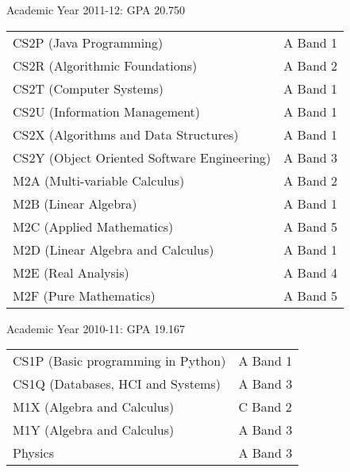 \documentclass[10pt,a4paper]{article}
\begin{document}
Academic Year 2011-12: GPA 20.750

\begin{tabular}{p{10cm}l}
    CS2P (Java Programming) & A Band 1\\
    CS2R (Algorithmic Foundations) & A Band 2\\
    CS2T (Computer Systems) & A Band 1\\
    CS2U (Information Management) & A Band 1\\
    CS2X (Algorithms and Data Structures) & A Band 1\\
    CS2Y (Object Oriented Software Engineering) & A Band 3\\
    M2A (Multi-variable Calculus) & A Band 2\\
    M2B (Linear Algebra) & A Band 1\\
    M2C (Applied Mathematics) & A Band 5\\
    M2D (Linear Algebra and Calculus) & A Band 1\\
    M2E (Real Analysis) & A Band 4\\
    M2F (Pure Mathematics) & A Band 5\\
\end{tabular}

Academic Year 2010-11: GPA 19.167

\begin{tabular}{p{10cm}l}
    CS1P (Basic programming in Python) & A Band 1\\
    CS1Q (Databases, HCI and Systems) & A Band 3\\
    M1X (Algebra and Calculus) & C Band 2\\
    M1Y (Algebra and Calculus) & A Band 3\\
    Physics & A Band 3\\
\end{tabular}
\end{document}

